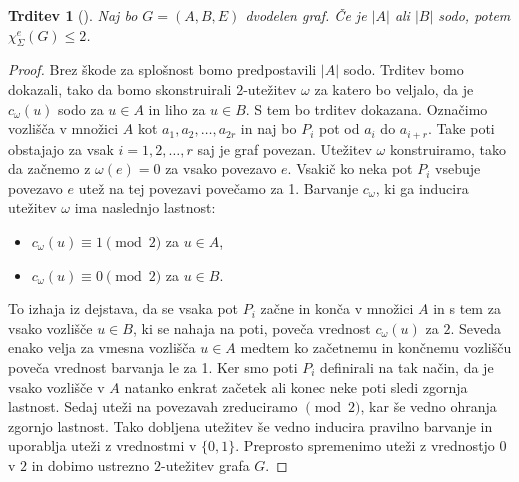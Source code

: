 \documentclass[12pt,a4paper,twoside]{article}
\theoremstyle{definition} %
\theoremstyle{plain} %
\newtheorem{trditev}[definicija]{Trditev}
\newcommand{\ec}{\chi_{\Sigma}^e}
\numberwithin{equation}{section}  %
\begin{document}
\begin{trditev}[\citet{examples}]
\label{dvosodo}	
Naj bo $G =(A,B,E)$ dvodelen graf. Če je $|A|$ ali $|B|$ sodo, potem $\ec(G) \le 2$.
\end{trditev}
\begin{proof}
Brez škode za splošnost bomo predpostavili $|A|$ sodo. Trditev bomo dokazali, tako da bomo skonstruirali $2$-utežitev $\omega$ za katero bo veljalo, da je $c_{\omega}(u)$ sodo za $u \in A$ in liho za $u \in B$. S tem bo trditev dokazana. Označimo vozlišča v množici $A$ kot $a_1, a_2, \ldots, a_{2r}$ in naj bo $P_i$ pot od $a_i$ do $a_{i + r}$. Take poti obstajajo za vsak $i = 1, 2, \ldots, r$ saj je graf povezan. Utežitev $\omega$ konstruiramo, tako da začnemo z $\omega(e) = 0$ za vsako povezavo $e$. Vsakič ko neka pot $P_i$ vsebuje povezavo $e$ utež na tej povezavi povečamo za 1. Barvanje $c_{\omega}$, ki ga inducira utežitev $\omega$ ima naslednjo lastnost:
\begin{itemize}
\item $c_{\omega}(u) \equiv 1 \pmod{2}$ za $u \in A$,
\item $c_{\omega}(u) \equiv 0 \pmod{2}$ za $u \in B$.
\end{itemize}
To izhaja iz dejstava, da se vsaka pot $P_i$ začne in konča v množici $A$ in s tem za vsako vozlišče $u \in B$, ki se nahaja na poti, poveča vrednost $c_{\omega}(u)$ za $2$. Seveda enako velja za vmesna vozlišča $u \in A$ medtem ko začetnemu in končnemu vozlišču poveča vrednost barvanja le za 1. Ker smo poti $P_i$ definirali na tak način, da je vsako vozlišče v $A$ natanko enkrat začetek ali konec neke poti sledi zgornja lastnost. Sedaj uteži na povezavah zreduciramo $\pmod{2}$, kar še vedno ohranja zgornjo lastnost. Tako dobljena utežitev še vedno inducira pravilno barvanje in uporablja uteži z vrednostmi  v $\{0,1\}$. Preprosto spremenimo uteži z vrednostjo $0$ v $2$ in dobimo ustrezno $2$-utežitev grafa $G$.
\end{proof}
\end{document}
